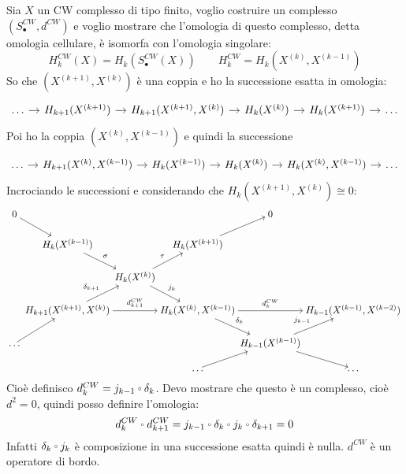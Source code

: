 \documentclass[10pt, twoside=false, x11names]{scrbook}
\let\latexcirc=\circ
\newcommand{\ccirc}{\mathbin{\mathchoice
  {\xcirc\scriptstyle}
  {\xcirc\scriptstyle}
  {\xcirc\scriptscriptstyle}
  {\xcirc\scriptscriptstyle}
}}
\newcommand{\xcirc}[1]{\vcenter{\hbox{$#1\latexcirc$}}}
\let\circ\ccirc
\begin{document}
Sia $ X $ un CW complesso di tipo finito, voglio costruire un complesso $ (S_\bullet^{CW}, d^{CW}) $ e
voglio mostrare che l'omologia di questo complesso, detta omologia cellulare, è isomorfa con
l'omologia singolare:
\[
  H_k^{CW}(X) = H_k(S^{CW}_\bullet(X)) \qquad H_k^{CW} = H_k(X^{(k)}, X^{(k-1)})
\]
So che $ (X^{(k+1)}, X^{(k)}) $ è una coppia
e ho la successione esatta in omologia:
\[
  \begin{tikzcd}[nodes={column sep=10pt}]
    \dots \rar  & H_{k+1}(X^{(k+1)}) \rar & H_{k+1}(X^{(k+1)}, X^{(k)}) \rar & H_k(X^{(k)})   \rar & H_k(X^{(k+1)}) \rar & \dots
  \end{tikzcd}
\]
Poi ho la coppia $ (X^{(k)}, X^{(k-1)}) $ e quindi la successione
\[
  \begin{tikzcd}[nodes={column sep=10pt}]
    \dots \rar & H_{k+1}(X^{(k)}, X^{(k-1)}) \rar & H_k(X^{(k-1)}) \rar & H_k(X^{(k)}) \rar & H_{k}(X^{(k)}, X^{(k-1)}) \rar & \dots
  \end{tikzcd}
\]
Incrociando le successioni e considerando che $ H_k(X^{(k+1)}, X^{(k)}) \cong 0$:
\[
  \begin{tikzcd}[nodes={column sep=1pt, inner sep=2pt, outer sep=1pt}]
  0            \arrow{dr}{}      & {}                   & {}                                         & {}                           & 0  & {}\\
  {}                              & H_k(X^{(k-1)})   \arrow{dr}{\sigma}                 & {}                                    & H_k(X^{(k+1)})  \arrow{ur}{} & {} & {}\\
  {}                             & {}             & H_k(X^{(k)})   \arrow{dr}{j_k}   \arrow{ur}{\tau} & {}                           & {} & {}\\
  {}  & H_{k+1}(X^{(k+1)}, X^{(k)})  \arrow{ur}{\delta_{k+1}} \arrow{rr}{d_{k+1}^{CW}} & {}      & H_k(X^{(k)}, X^{(k-1)})  \arrow{rr}{d_{k}^{CW}}   \arrow{dr}{\delta_k}  & {} &  H_{k-1}(X^{(k-1)}, X^{(k-2)}) \\
  \dots \arrow{ur}{} & {} & {} & {} & H_{k-1}(X^{(k-1)}) \arrow{ur}{j_{k-1}} \arrow{dr}{} & {} \\
  {} & {} & {} & \dots \arrow{ur}{} & {} & \dots
\end{tikzcd}
\]
Cioè definisco $ d_k^{CW} = j_{k-1} \circ \delta_k $. Devo mostrare che questo è un complesso, cioè $ d^2 = 0 $,
quindi posso definire l'omologia:
\[
   d_k^{CW} \circ  d_{k+1}^{CW} = j_{k-1} \circ \delta_k \circ j_k \circ \delta_{k+1} = 0
\]
Infatti $ \delta_k \circ j_k $ è composizione in una successione esatta quindi è nulla.
$ d^{CW} $ è un operatore di bordo.
\end{document}

